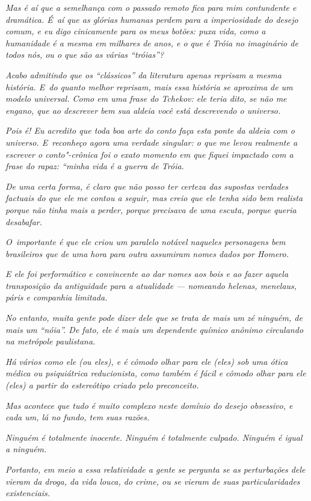 \emph{Mas é aí que a semelhança com o passado remoto fica para mim
contundente e dramática. É~aí que as glórias humanas perdem para a
imperiosidade do desejo comum, e eu digo cinicamente para os meus
botões: puxa vida, como a humanidade é a mesma em milhares de anos, e o
que é Tróia no imaginário de todos nós, ou o que são as várias
``tróias''?}~

\emph{Acabo admitindo que os ``clássicos'' da literatura apenas reprisam
a mesma história. E~do quanto melhor reprisam, mais essa história se
aproxima de um modelo universal. Como em uma frase do Tchekov: ele teria
dito, se não me engano, que ao descrever bem sua aldeia você está
descrevendo o universo.}~

\emph{Pois é! Eu acredito que toda boa arte do conto faça esta ponte da
aldeia com o universo. E~reconheço agora uma verdade singular: o que me
levou realmente a escrever o conto"-crônica foi o exato momento em que
fiquei impactado com a frase do rapaz: ``minha vida é a guerra de
Tróia.}~

\emph{De uma certa forma, é claro que não posso ter certeza das supostas
verdades factuais do que ele me contou a seguir, mas creio que ele tenha
sido bem realista porque não tinha mais a perder, porque precisava de
uma escuta, porque queria desabafar.}~

\emph{O~importante é que ele criou um paralelo notável naqueles
personagens bem brasileiros que de uma hora para outra assumiram nomes
dados por Homero.}~

\emph{E ele foi performático e convincente ao dar nomes aos bois e ao
fazer aquela transposição da antiguidade para a atualidade --- nomeando
helenas, menelaus, páris e companhia limitada.}~

\emph{No entanto, muita gente pode dizer dele que se trata de mais um zé
ninguém, de mais um ``nóia''. De fato, ele é mais um dependente químico
anônimo circulando na metrópole paulistana.}~

\emph{Há vários como ele (ou eles), e é cômodo olhar para ele (eles) sob
uma ótica médica ou psiquiátrica reducionista, como também é fácil e
cômodo olhar para ele (eles) a partir do estereótipo criado pelo
preconceito.}~

\emph{Mas acontece que tudo é muito complexo neste domínio do desejo
obsessivo, e cada um, lá no fundo, tem suas razões.}~

\emph{Ninguém é totalmente inocente. Ninguém é totalmente culpado.
Ninguém é igual a ninguém.}~

\emph{Portanto, em meio a essa relatividade a gente se pergunta se as
perturbações dele vieram da droga, da vida louca, do crime, ou se vieram
de suas particularidades existenciais.}~

